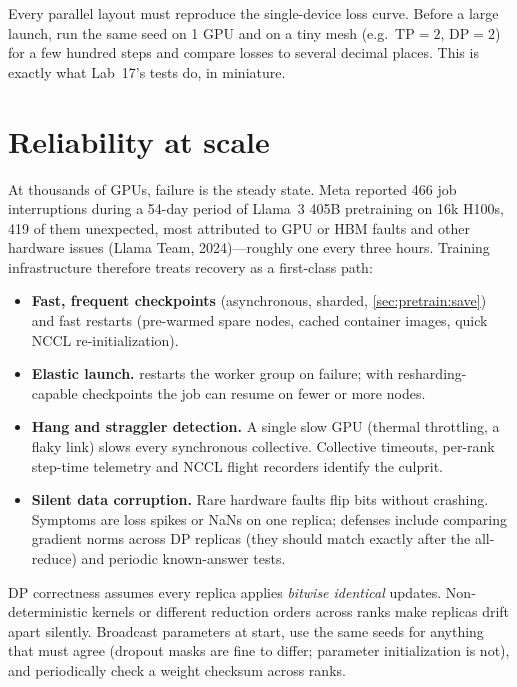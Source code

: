 \begin{pitfall}
Every parallel layout must reproduce the single-device loss curve. Before a large launch, run
the same seed on 1 GPU and on a tiny mesh (e.g.\ $\text{TP}=2$, $\text{DP}=2$) for a few hundred
steps and compare losses to several decimal places. This is exactly what Lab~17's tests do, in
miniature.
\end{pitfall}

\section{Reliability at scale}\label{sec:dist:reliability}

At thousands of GPUs, failure is the steady state. Meta reported 466 job interruptions during
a 54-day period of Llama~3 405B pretraining on 16k H100s, 419 of them unexpected, most
attributed to GPU or HBM faults and other hardware issues (Llama Team, 2024)---roughly one every
three hours. Training infrastructure therefore treats recovery as a first-class path:
\begin{itemize}
\item \textbf{Fast, frequent checkpoints} (asynchronous, sharded, \cref{sec:pretrain:save}) and
  fast restarts (pre-warmed spare nodes, cached container images, quick NCCL
  re-initialization).
\item \textbf{Elastic launch.}  restarts the worker group on failure; with
  resharding-capable checkpoints the job can resume on fewer or more nodes.
\item \textbf{Hang and straggler detection.} A single slow GPU (thermal throttling, a flaky
  link) slows every synchronous collective. Collective timeouts, per-rank step-time telemetry
  and NCCL flight recorders identify the culprit.
\item \textbf{Silent data corruption.} Rare hardware faults flip bits without crashing.
  Symptoms are loss spikes or NaNs on one replica; defenses include comparing gradient norms
  across DP replicas (they should match exactly after the all-reduce) and periodic
  known-answer tests.
\end{itemize}

\begin{pitfall}
DP correctness assumes every replica applies \emph{bitwise identical} updates. Non-deterministic
kernels or different reduction orders across ranks make replicas drift apart silently. Broadcast
parameters at start, use the same seeds for anything that must agree (dropout masks are fine to
differ; parameter initialization is not), and periodically check a weight checksum across ranks.
\end{pitfall}

